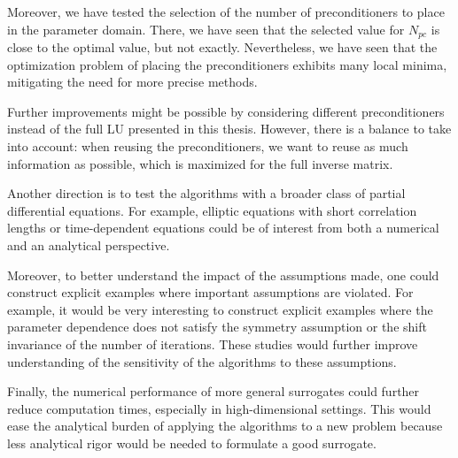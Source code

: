 Moreover, we have tested the selection of the number of preconditioners to place in the parameter domain.
There, we have seen that the selected value for $N_{pc}$ is close to the optimal value, but not exactly.
Nevertheless, we have seen that the optimization problem of placing the preconditioners exhibits many local minima, mitigating the need for more precise methods.

Further improvements might be possible by considering different preconditioners instead of the full LU presented in this thesis.
However, there is a balance to take into account: when reusing the preconditioners, we want to reuse as much information as possible, which is maximized for the full inverse matrix.

Another direction is to test the algorithms with a broader class of partial differential equations.
For example, elliptic equations with short correlation lengths or time-dependent equations could be of interest from both a numerical and an analytical perspective.

Moreover, to better understand the impact of the assumptions made, one could construct explicit examples where important assumptions are violated.
For example, it would be very interesting to construct explicit examples where the parameter dependence does not satisfy the symmetry assumption or the shift invariance of the number of iterations.
These studies would further improve understanding of the sensitivity of the algorithms to these assumptions.

Finally, the numerical performance of more general surrogates could further reduce computation times, especially in high-dimensional settings.
This would ease the analytical burden of applying the algorithms to a new problem because less analytical rigor would be needed to formulate a good surrogate.
